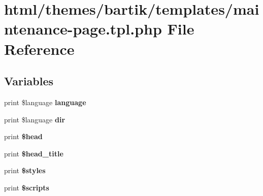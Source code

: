\hypertarget{themes_2bartik_2templates_2maintenance-page_8tpl_8php}{
\section{html/themes/bartik/templates/maintenance-\/page.tpl.php File Reference}
\label{themes_2bartik_2templates_2maintenance-page_8tpl_8php}
}
\subsection*{Variables}
\begin{DoxyCompactItemize}
\item 
\hypertarget{themes_2bartik_2templates_2maintenance-page_8tpl_8php_a42cd582c44c919666b05626f0b2a39d3}{
print \$language {\bfseries language}}
\label{themes_2bartik_2templates_2maintenance-page_8tpl_8php_a42cd582c44c919666b05626f0b2a39d3}

\item 
\hypertarget{themes_2bartik_2templates_2maintenance-page_8tpl_8php_a9046a842bdd63fcdce32768992ca7e93}{
print \$language {\bfseries dir}}
\label{themes_2bartik_2templates_2maintenance-page_8tpl_8php_a9046a842bdd63fcdce32768992ca7e93}

\item 
\hypertarget{themes_2bartik_2templates_2maintenance-page_8tpl_8php_a2758cd2886f39b56c05b61ab6cec7a5d}{
print {\bfseries \$head}}
\label{themes_2bartik_2templates_2maintenance-page_8tpl_8php_a2758cd2886f39b56c05b61ab6cec7a5d}

\item 
\hypertarget{themes_2bartik_2templates_2maintenance-page_8tpl_8php_a107cec09f27fd63715a39ba222571e1e}{
print {\bfseries \$head\_\-title}}
\label{themes_2bartik_2templates_2maintenance-page_8tpl_8php_a107cec09f27fd63715a39ba222571e1e}

\item 
\hypertarget{themes_2bartik_2templates_2maintenance-page_8tpl_8php_a8f1db0526d0e6b99ae580d83209e717f}{
print {\bfseries \$styles}}
\label{themes_2bartik_2templates_2maintenance-page_8tpl_8php_a8f1db0526d0e6b99ae580d83209e717f}

\item 
\hypertarget{themes_2bartik_2templates_2maintenance-page_8tpl_8php_a2163fdf9fe7af884a6291084c2811896}{
print {\bfseries \$scripts}}
\label{themes_2bartik_2templates_2maintenance-page_8tpl_8php_a2163fdf9fe7af884a6291084c2811896}


\end{DoxyCompactItemize}
